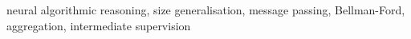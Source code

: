 neural algorithmic reasoning, size generalisation, message passing, Bellman-Ford, aggregation, intermediate supervision
